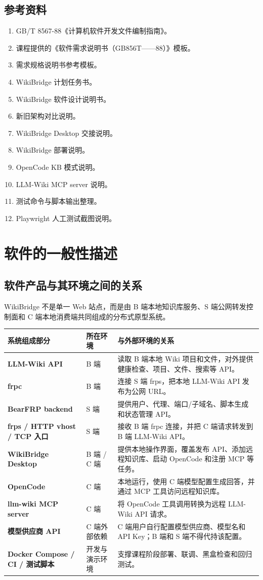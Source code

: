 \documentclass[UTF8,a4paper,12pt,fontset=fandol]{ctexart}
\begin{document}
\subsection{参考资料}
\begin{enumerate}
  \item GB/T 8567-88《计算机软件开发文件编制指南》。
  \item 课程提供的《软件需求说明书（GB856T——88）》模板。
  \item 需求规格说明书参考模板。
  \item WikiBridge 计划任务书。
  \item WikiBridge 软件设计说明书。
  \item 新旧架构对比说明。
  \item WikiBridge Desktop 交接说明。
  \item WikiBridge 部署说明。
  \item OpenCode KB 模式说明。
  \item LLM-Wiki MCP server 说明。
  \item 测试命令与脚本输出整理。
  \item Playwright 人工测试截图说明。
\end{enumerate}

\section{软件的一般性描述}

\subsection{软件产品与其环境之间的关系}
WikiBridge 不是单一 Web 站点，而是由 B 端本地知识库服务、S 端公网转发控制面和 C 端本地消费端共同组成的分布式原型系统。

\begin{longtable}{>{\bfseries}p{3.2cm}p{2.7cm}p{8.3cm}}
\toprule
系统组成部分 & 所在环境 & 与外部环境的关系 \\
\midrule
LLM-Wiki API & B 端 & 读取 B 端本地 Wiki 项目和文件，对外提供健康检查、项目、文件、搜索等 API。 \\
frpc & B 端 & 连接 S 端 frps，把本地 LLM-Wiki API 发布为公网 URL。 \\
BearFRP backend & S 端 & 提供用户、代理、端口/子域名、脚本生成和状态管理 API。 \\
frps / HTTP vhost / TCP 入口 & S 端 & 接收 B 端 frpc 连接，并把 C 端请求转发到 B 端 LLM-Wiki API。 \\
WikiBridge Desktop & B 端 / C 端 & 提供本地操作界面，覆盖发布 API、添加远程知识库、启动 OpenCode 和注册 MCP 等任务。 \\
OpenCode & C 端 & 本地运行，使用 C 端模型配置生成回答，并通过 MCP 工具访问远程知识库。 \\
llm-wiki MCP server & C 端 & 将 OpenCode 工具调用转换为远程 LLM-Wiki API 请求。 \\
模型供应商 API & C 端外部依赖 & C 端用户自行配置模型供应商、模型名和 API Key；B 端和 S 端不得代持该配置。 \\
Docker Compose / CI / 测试脚本 & 开发与演示环境 & 支撑课程阶段部署、联调、黑盒检查和回归测试。 \\
\bottomrule
\end{longtable}
\end{document}
